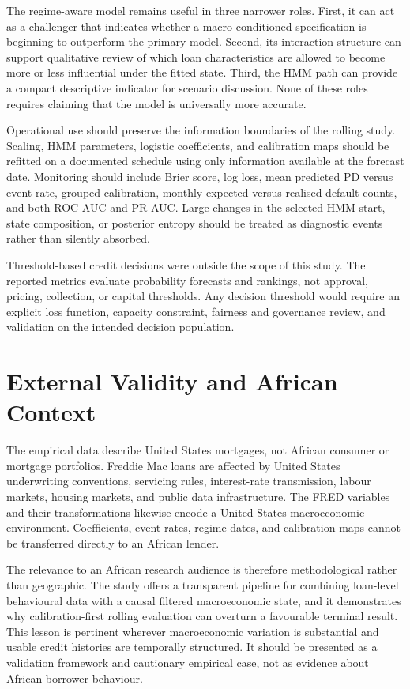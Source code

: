 The regime-aware model remains useful in three narrower roles. First, it can act as a challenger that indicates whether a macro-conditioned specification is beginning to outperform the primary model. Second, its interaction structure can support qualitative review of which loan characteristics are allowed to become more or less influential under the fitted state. Third, the HMM path can provide a compact descriptive indicator for scenario discussion. None of these roles requires claiming that the model is universally more accurate.

Operational use should preserve the information boundaries of the rolling study. Scaling, HMM parameters, logistic coefficients, and calibration maps should be refitted on a documented schedule using only information available at the forecast date. Monitoring should include Brier score, log loss, mean predicted PD versus event rate, grouped calibration, monthly expected versus realised default counts, and both ROC-AUC and PR-AUC. Large changes in the selected HMM start, state composition, or posterior entropy should be treated as diagnostic events rather than silently absorbed.

Threshold-based credit decisions were outside the scope of this study. The reported metrics evaluate probability forecasts and rankings, not approval, pricing, collection, or capital thresholds. Any decision threshold would require an explicit loss function, capacity constraint, fairness and governance review, and validation on the intended decision population.

\section{External Validity and African Context}

The empirical data describe United States mortgages, not African consumer or mortgage portfolios. Freddie Mac loans are affected by United States underwriting conventions, servicing rules, interest-rate transmission, labour markets, housing markets, and public data infrastructure. The FRED variables and their transformations likewise encode a United States macroeconomic environment. Coefficients, event rates, regime dates, and calibration maps cannot be transferred directly to an African lender.

The relevance to an African research audience is therefore methodological rather than geographic. The study offers a transparent pipeline for combining loan-level behavioural data with a causal filtered macroeconomic state, and it demonstrates why calibration-first rolling evaluation can overturn a favourable terminal result. This lesson is pertinent wherever macroeconomic variation is substantial and usable credit histories are temporally structured. It should be presented as a validation framework and cautionary empirical case, not as evidence about African borrower behaviour.

